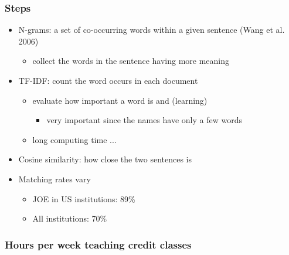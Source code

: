 \documentclass[11pt]{beamer}
\begin{document}
\begin{frame}
	\frametitle{Steps}
	\begin{itemize}
	\item N-grams: a set of co-occurring words within a given sentence (Wang et al. 2006)
	\begin{itemize}
		\item collect the words in the sentence having more meaning
	\end{itemize}
	\item TF-IDF: count the word occurs in each document
	\begin{itemize}
		\item evaluate how important a word is and (learning)
		\begin{itemize}
			\item very important since the names have only a few words
		\end{itemize}
		\item long computing time ...
	\end{itemize}
	\item Cosine similarity: how close the two sentences is
	\item Matching rates vary
	\begin{itemize}
		\item JOE in US institutions: 89\%
		\item All institutions: 70\%
	\end{itemize}
	\end{itemize}
\hyperlink{Data}{}
\end{frame}


\begin{frame}[label = teaching]
	\frametitle{Hours per week teaching credit classes}
	
	\hyperlink{Occupation}{}
\end{frame}
\end{document}

